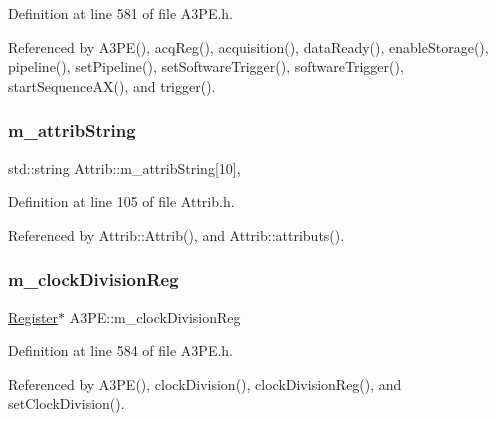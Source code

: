 Definition at line 581 of file A3\+P\+E.\+h.



Referenced by A3\+P\+E(), acq\+Reg(), acquisition(), data\+Ready(), enable\+Storage(), pipeline(), set\+Pipeline(), set\+Software\+Trigger(), software\+Trigger(), start\+Sequence\+A\+X(), and trigger().

\mbox{\label{classAttrib_a3414521d7a82476e874b25a5407b5e63}} 
\subsubsection{\texorpdfstring{m\+\_\+attrib\+String}{m\_attribString}}
{\footnotesize\ttfamily std\+::string Attrib\+::m\+\_\+attrib\+String\mbox{[}10\mbox{]}\hspace{0.3cm}{\ttfamily [protected]}, {\ttfamily [inherited]}}



Definition at line 105 of file Attrib.\+h.



Referenced by Attrib\+::\+Attrib(), and Attrib\+::attributs().

\mbox{\label{classA3PE_ae1f4c24a99c2e6ae944a080f429cc155}} 
\subsubsection{\texorpdfstring{m\+\_\+clock\+Division\+Reg}{m\_clockDivisionReg}}
{\footnotesize\ttfamily \hyperlink{classRegister}{Register}$\ast$ A3\+P\+E\+::m\+\_\+clock\+Division\+Reg\hspace{0.3cm}{\ttfamily [private]}}



Definition at line 584 of file A3\+P\+E.\+h.



Referenced by A3\+P\+E(), clock\+Division(), clock\+Division\+Reg(), and set\+Clock\+Division().

\mbox{\label{classElement_abe3de7a5dbbc9a6dd2d7e012e5fdb266}} 
